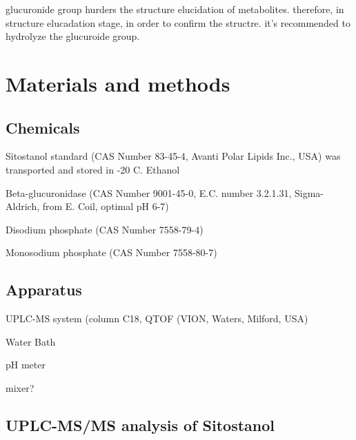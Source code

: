 glucuronide group hurders the structure elucidation of metabolites.
therefore, in structure elucadation stage, in order to confirm the structre. it's recommended to hydrolyze the glucuroide group.
\section{Materials and methods}
\subsection{Chemicals}
Sitostanol standard (CAS Number 83-45-4, Avanti Polar Lipids Inc., USA) was transported and stored in -20 \degree C. Ethanol

Beta-glucuronidase (CAS Number 9001-45-0, E.C. number 3.2.1.31, Sigma-Aldrich, from E. Coil, optimal pH 6-7)

Disodium phosphate (CAS Number 7558-79-4)

Monosodium phosphate (CAS Number 7558-80-7)



\subsection{Apparatus}
UPLC-MS system (column C18, QTOF (VION, Waters, Milford, USA)

Water Bath

pH meter

mixer?

\subsection{UPLC-MS/MS analysis of Sitostanol}

